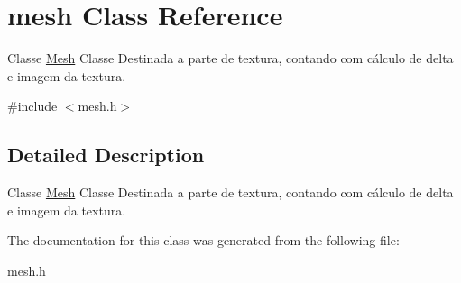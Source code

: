 \hypertarget{classmesh}{\section{mesh Class Reference}
\label{classmesh}
}


Classe \hyperlink{classMesh}{Mesh} Classe Destinada a parte de textura, contando com cálculo de delta e imagem da textura.  




{\ttfamily \#include $<$mesh.\-h$>$}



\subsection{Detailed Description}
Classe \hyperlink{classMesh}{Mesh} Classe Destinada a parte de textura, contando com cálculo de delta e imagem da textura. 

The documentation for this class was generated from the following file\-:\begin{DoxyCompactItemize}
\item 
mesh.\-h\end{DoxyCompactItemize}
